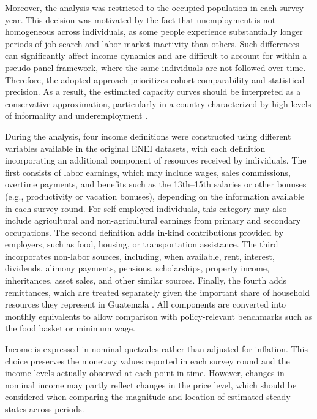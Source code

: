 \documentclass{article}
\begin{document}
Moreover, the analysis was restricted to the occupied population in each survey year. This decision was motivated by the fact that unemployment is not homogeneous across individuals, as some people experience substantially longer periods of job search and labor market inactivity than others. Such differences can significantly affect income dynamics and are difficult to account for within a pseudo-panel framework, where the same individuals are not followed over time. Therefore, the adopted approach prioritizes cohort comparability and statistical precision. As a result, the estimated capacity curves should be interpreted as a conservative approximation, particularly in a country characterized by high levels of informality and underemployment \parencite{ine2025eneic}.

During the analysis, four income definitions were constructed using different variables available in the original ENEI datasets, with each definition incorporating an additional component of resources received by individuals. The first consists of labor earnings, which may include wages, sales commissions, overtime payments, and benefits such as the 13th–15th salaries or other bonuses (e.g., productivity or vacation bonuses), depending on the information available in each survey round. For self-employed individuals, this category may also include agricultural and non-agricultural earnings from primary and secondary occupations. The second definition adds in-kind contributions provided by employers, such as food, housing, or transportation assistance. The third incorporates non-labor sources, including, when available, rent, interest, dividends, alimony payments, pensions, scholarships, property income, inheritances, asset sales, and other similar sources. Finally, the fourth adds remittances, which are treated separately given the important share of household resources they represent in Guatemala \parencite{iom2022remittances,banguat2026remittances}. All components are converted into monthly equivalents to allow comparison with policy-relevant benchmarks such as the food basket or minimum wage. 

Income is expressed in nominal quetzales rather than adjusted for inflation. This choice preserves the monetary values reported in each survey round and the income levels actually observed at each point in time. However, changes in nominal income may partly reflect changes in the price level, which should be considered when comparing the magnitude and location of estimated steady states across periods.
\end{document}
